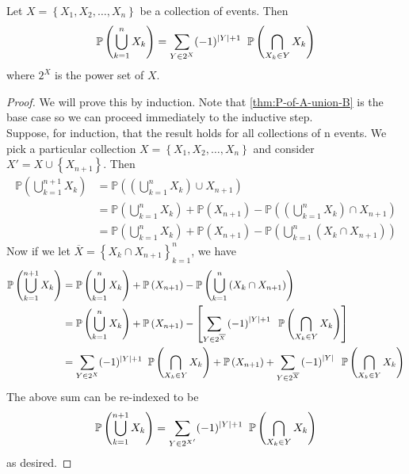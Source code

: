 \begin{theorem}
Let \( X = \left\{ X_{1}, X_{2}, \dots, X_{n} \right\} \) be a collection of events. Then 
\[ \mathbb{P} \left( \bigcup_{k=1}^{n} X_{k} \right) = \sum_{Y \in 2^{X}} (-1)^{\abs{Y}+1} \;  \; \mathbb{P} \left( \bigcap_{X_{k} \in Y} X_{k} \right)\] where \( 2^{X} \) is the power set of \( X \).
\end{theorem}
\begin{proof}
    We will prove this by induction. Note that \cref{thm:P-of-A-union-B} is the base case so we can proceed immediately to the inductive step. \\ 
    Suppose, for induction, that the result holds for all collections of n events. We pick a particular collection \( X = \left\{  X_{1}, X_{2}, \dots, X_{n}\right\} \) and consider \( X' = X \cup \left\{ X_{n+1} \right\} \). Then 
    \begin{align*}
        \mathbb{P} \left( \bigcup_{k=1}^{n+1} X_{k}\right) &= \mathbb{P} \left(   \left(  \bigcup_{k=1}^{n} X_{k}\right) \cup X_{n+1} \right) \\
        &=\mathbb{P} \left( \bigcup_{k=1}^{n} X_{k} \right) + \mathbb{P} \left( X_{n+1} \right) - \mathbb{P} \left(   \left(  \bigcup_{k=1}^{n} X_{k}\right) \cap X_{n+1} \right) \tag*{By the base case.} \\
        &= \mathbb{P} \left( \bigcup_{k=1}^{n} X_{k} \right) + \mathbb{P} \left( X_{n+1} \right) - \mathbb{P} \left( \bigcup_{k=1}^{n} \left( X_{k} \cap X_{n+1} \right) \right)
    \end{align*}
    Now if we let \( \overline{X} = \left\{ X_{k} \cap X_{n+1} \right\}_{k=1}^n \), we have 
    \begin{align*}
         \mathbb{P} \left( \bigcup_{k=1}^{n+1} X_{k}\right) &= \mathbb{P} \left( \bigcup_{k=1}^{n} X_{k} \right) + \mathbb{P} \left( X_{n+1} \right) - \mathbb{P} \left( \bigcup_{k=1}^{n} \left( X_{k} \cap X_{n+1} \right) \right) \\
         &= \mathbb{P} \left( \bigcup_{k=1}^{n} X_{k} \right) + \mathbb{P} \left( X_{n+1} \right) - \left[ \sum_{Y \in 2^{\overline{X}}} \left( -1 \right)^{\abs{Y}+1} \; \; \mathbb{P} \left( \bigcap_{X_{k} \in Y} X_{k} \right) \right] \\
         &= \sum_{Y \in 2^{X}} (-1)^{\abs{Y}+1} \;  \; \mathbb{P} \left( \bigcap_{X_{k} \in Y} X_{k} \right) + \mathbb{P} \left( X_{n+1} \right) +  \sum_{Y \in 2^{\overline{X}}} \left( -1 \right)^{\abs{Y}} \; \; \mathbb{P} \left( \bigcap_{X_{k} \in Y} X_{k} \right)
    \end{align*}
   The above sum can be re-indexed to be 
   \[  \mathbb{P} \left( \bigcup_{k=1}^{n+1} X_{k}\right) = \sum_{Y \in 2^{X'}} (-1)^{\abs{Y}+1} \;  \; \mathbb{P} \left( \bigcap_{X_{k} \in Y} X_{k} \right) \]
   as desired. 
\end{proof}



